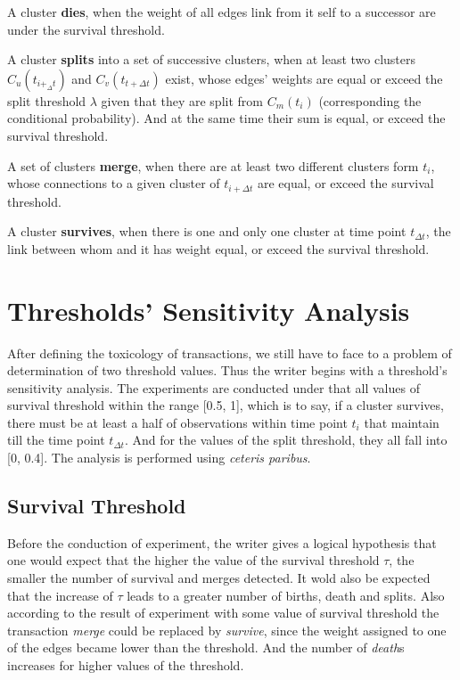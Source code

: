 \documentclass{sig-alternate}
\begin{document}
A cluster \textbf{dies}, when the weight of all edges link from it self to a successor are under the survival threshold.

A cluster \textbf{splits} into a set of successive clusters, when at least two clusters $C_u(t_{i+_\Delta t})$ and $C_v(t_{t+\Delta t})$ exist, whose edges' weights are equal or exceed the split threshold $\lambda$ given that they are split from $C_m(t_i)$ (corresponding the conditional probability). And at the same time their sum is equal, or exceed the survival threshold.

A set of clusters \textbf{merge}, when there are at least two different clusters form $t_i$, whose connections to a given cluster of $t_{i+\Delta t}$ are equal, or exceed the survival threshold.

A cluster \textbf{survives}, when there is one and only one cluster at time point $t_{\Delta t}$, the link between whom and it has weight equal, or exceed the survival threshold.

\section{Thresholds' Sensitivity Analysis}
After defining the toxicology of transactions, we still have to face to a problem of determination of two threshold values. Thus the writer begins with a threshold's sensitivity analysis. The experiments are conducted under that all values of survival threshold within the range [0.5, 1], which is to say, if a cluster survives, there must be at least a half of observations within time point $t_i$ that maintain till the time point $t_{\Delta t}$. And for the values of the split threshold, they all fall into [0, 0.4]. The analysis is performed using \emph{ceteris paribus}.
\subsection{Survival Threshold}
Before the conduction of experiment, the writer gives a logical hypothesis that one would expect that the higher the value of the survival threshold $\tau$, the smaller the number of survival and merges detected. It wold also be expected that the increase of $\tau$ leads to a greater number of births, death and splits. Also according to the result of experiment with some value of survival threshold the transaction \emph{merge} could be replaced by \emph{survive}, since the weight assigned to one of the edges became lower than the threshold. And the number of \emph{death}s increases for higher values of the threshold.
\end{document}
